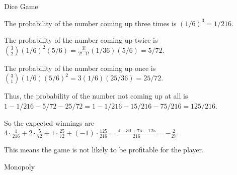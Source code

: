 \documentclass[../main.tex]{subfiles}
\begin{document}
\begin{questions}

  \question Dice Game
  \begin{solution}

    The probability of the number coming up three times is $(1/6)^3 = 1/216$.

    The probability of the number coming up twice is $\binom{3}{2} (1/6)^2 (5/6) = \frac{3!}{2! \cdot 1!} (1/36) (5/6) = 5/72$.

    The probability of the number coming up once is $\binom{3}{1} (1/6) (5/6)^2 = 3 (1/6) (25/36) = 25/72$.

    Thus, the probability of the number not coming up at all is $1 - 1/216 - 5/72 - 25/72 = 1 - 1/216 - 15/216 - 75/216 = 125/216$.

    So the expected winnings are $4 \cdot \frac{1}{216} + 2 \cdot \frac{5}{72} + 1 \cdot \frac{25}{72} + (-1) \cdot \frac{125}{216} = \frac{4 + 30 + 75 - 125}{216} = -\frac{2}{27}$.

    This means the game is not likely to be profitable for the player.
  \end{solution}

  \question Monopoly
\end{questions}
\end{document}
